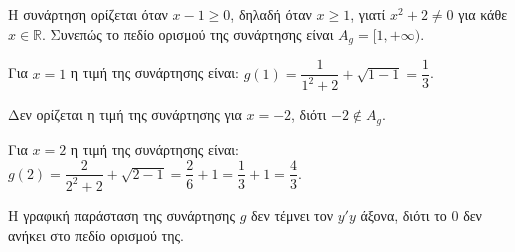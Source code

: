 
\begin{alist}
\item Η συνάρτηση ορίζεται όταν $x - 1 \ge 0$, δηλαδή όταν $x \ge 1$, γιατί $x^2 + 2 \ne 0$ για κάθε $x \in \mathbb{R}$.
Συνεπώς το πεδίο ορισμού της συνάρτησης είναι $A_g = [1, +\infty)$.

\item Για $x = 1$ η τιμή της συνάρτησης είναι: $g(1) = \dfrac{1}{1^2 + 2} + \sqrt{1 - 1} = \dfrac{1}{3}$.

Δεν ορίζεται η τιμή της συνάρτησης για $x = -2$, διότι $-2 \notin A_g$.

Για $x = 2$ η τιμή της συνάρτησης είναι: $g(2) = \dfrac{2}{2^2 + 2} + \sqrt{2 - 1} = \dfrac{2}{6} + 1 = \dfrac{1}{3} + 1 = \dfrac{4}{3}$.

\item Η γραφική παράσταση της συνάρτησης $g$ δεν τέμνει τον $y'y$ άξονα, διότι το $0$ δεν
ανήκει στο πεδίο ορισμού της.
\end{alist}

